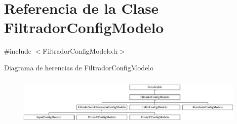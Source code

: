 \hypertarget{classFiltradorConfigModelo}{\section{\-Referencia de la \-Clase \-Filtrador\-Config\-Modelo}
\label{classFiltradorConfigModelo}
}


{\ttfamily \#include $<$\-Filtrador\-Config\-Modelo.\-h$>$}

\-Diagrama de herencias de \-Filtrador\-Config\-Modelo\begin{figure}[H]
\begin{center}
\leavevmode
\includegraphics[height=2.434783cm]{classFiltradorConfigModelo}
\end{center}
\end{figure}
